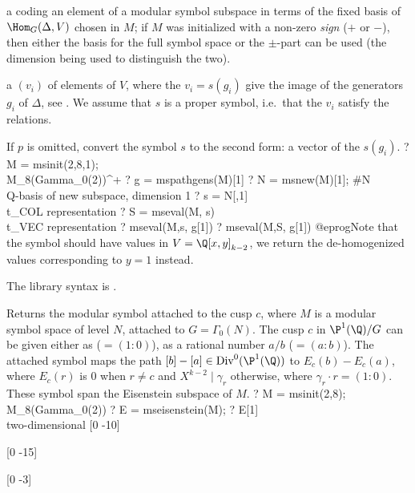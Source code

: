 \item a  coding an element of a modular symbol subspace in terms of
the fixed basis of $\Hom_G(\Delta,V)$ chosen in $M$; if $M$ was
initialized with a non-zero \emph{sign} ($+$ or $-$), then either the
basis for the full symbol space or the $\pm$-part can be used (the dimension
being used to distinguish the two).

\item a  $(v_i)$ of elements of $V$, where the $v_i = s(g_i)$ give
the image of the generators $g_i$ of $\Delta$, see .
We assume that $s$ is a proper symbol, i.e.~that the $v_i$ satisfy
the  relations.

If $p$ is omitted, convert the symbol $s$ to the second form: a vector of
the $s(g_i)$.
\bprog
? M = msinit(2,8,1); \\ M_8(Gamma_0(2))^+
? g = mspathgens(M)[1]
? N = msnew(M)[1]; #N \\ Q-basis of new subspace, dimension 1
? s = N[,1]         \\ t_COL representation
? S = mseval(M, s)   \\ t_VEC representation
? mseval(M,s, g[1])
? mseval(M,S, g[1])
@eprog\noindent Note that the symbol should have values in
$V = \Q[x,y]_{k-2}$, we return the de-homogenized values corresponding to $y
= 1$ instead.

The library syntax is .

\label{se:msfromcusp}
Returns the modular symbol attached to the cusp
$c$, where $M$ is a modular symbol space of level $N$, attached to
$G = \Gamma_0(N)$. The cusp $c$ in  $\P^1(\Q)/G$
can be given either as  ($=(1:0)$), as a rational number $a/b$
($=(a:b)$). The attached symbol maps the path $[b] - [a] \in
\text{Div}^0 (\P^1(\Q))$ to $E_c(b) - E_c(a)$, where $E_c(r)$ is
$0$ when $r \neq c$ and $X^{k-2} \mid \gamma_r$ otherwise, where
$\gamma_r \cdot r = (1:0)$. These symbol span the  Eisenstein subspace
of $M$.
\bprog
? M = msinit(2,8);  \\  M_8(Gamma_0(2))
? E =  mseisenstein(M);
? E[1] \\ two-dimensional
[0 -10]

[0 -15]

[0  -3]

